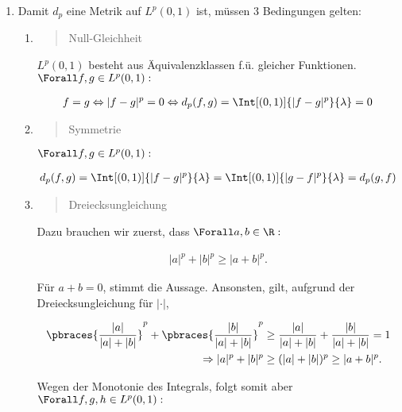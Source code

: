 \begin{solution}

\phantom{}

\begin{enumerate}[label = (\alph*)]

  \item
  Damit $d_p$ eine Metrik auf $L^p(0, 1)$ ist, müssen 3 Bedingungen gelten:

  \begin{enumerate}[label = (\roman*)]

    \item
    \blockquote{Null-Gleichheit}:
    $L^p(0, 1)$ besteht aus Äquivalenzklassen f.ü. gleicher Funktionen. $\Forall f, g \in L^p(0, 1):$

    \begin{align*}
      f = g
      \Leftrightarrow
      |f - g|^p = 0
      \Leftrightarrow
      d_p(f, g)
      =
      \Int[(0, 1)]{|f - g|^p}{\lambda} = 0
    \end{align*}

    \item
    \blockquote{Symmetrie}:
    $\Forall f, g \in L^p(0, 1):$

    \begin{align*}
      d_p(f, g)
      =
      \Int[(0, 1)]{|f - g|^p}{\lambda}
      =
      \Int[(0, 1)]{|g - f|^p}{\lambda}
      =
      d_p(g, f)
    \end{align*}

    \item
    \blockquote{Dreiecksungleichung}:
    Dazu brauchen wir zuerst, dass $\Forall a, b \in \R:$

    \begin{align*}
      |a|^p + |b|^p \geq |a + b|^p.
    \end{align*}

    Für $a + b = 0$, stimmt die Aussage.
    Ansonsten, gilt, aufgrund der Dreiecksungleichung für $|\cdot|$,

    \begin{align*}
      \pbraces{\frac{|a|}{|a| + |b|}}^p +
      \pbraces{\frac{|b|}{|a| + |b|}}^p
      & \geq
      \frac{|a|}{|a| + |b|} +
      \frac{|b|}{|a| + |b|} = 1 \\
      \Rightarrow
      |a|^p + |b|^p
      & \geq
      (|a| + |b|)^p
      \geq
      |a + b|^p.
    \end{align*}

    Wegen der Monotonie des Integrals, folgt somit aber $\Forall f, g, h \in L^p(0, 1):$


\end{enumerate}
\end{enumerate}
\end{solution}
